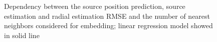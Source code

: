 \documentclass[applsci,article,submit,moreauthors,pdftex]{Definitions/mdpi}
\begin{document}
\begin{figure}[h!]
	\centering
	\caption{Dependency between the source position prediction, source \doa{} estimation  and radial estimation RMSE and the number of nearest neighbors considered for \isomap{} embedding; linear regression model showed in solid line}
	\label{fig:rmsenneighbors}
\end{figure}
\end{document}
